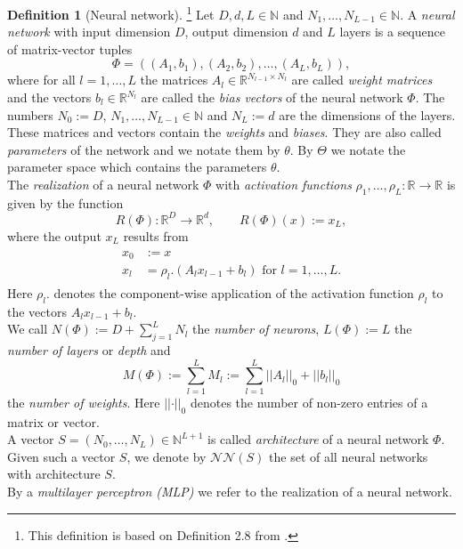 \documentclass[11pt,titlepage]{article}
\newcommand{\R}{\mathbb{R}} %
\newcommand{\N}{\mathbb{N}} %
\newcommand{\abs}[1]{{\left| #1 \right|}}
\theoremstyle{definition}
\newtheorem{definition}[theorem]{Definition}
\theoremstyle{remark}
\begin{document}
	\begin{definition}[Neural network]\footnote{This definition is based on Definition 2.8 from \cite{Petersen2022}.}
		Let $D, d, L\in\N$ and $N_1,\ldots,N_{L-1}\in\N$. A \textsl{neural network} with input dimension $D$, output dimension $d$ and $L$ layers is a sequence of matrix-vector tuples
		\[\Phi = ((A_1,b_1),(A_2,b_2),\ldots,(A_L,b_L)),\]
		where for all $l=1,\ldots, L$ the matrices $A_l\in\R^{N_{l-1}\times N_l}$ are called \textsl{weight matrices} and the vectors $b_l\in \R^{N_l}$ are called the \textsl{bias vectors} of the neural network $\Phi$. The numbers $N_0:= D$, $N_1,\ldots,N_{L-1}\in\N$ and $N_L:= d$ are the dimensions of the layers. These matrices and vectors contain the \textsl{weights} and \textsl{biases}. They are also called \textsl{parameters} of the network and we notate them by $\theta$. By $\Theta$ we notate the parameter space which contains the parameters $\theta$.\\
		The \textsl{realization} of a neural network $\Phi$ with \textsl{activation functions} 
		$\rho_1,\ldots,\rho_{L}:\R\to\R$ is given by the function
		\[R(\Phi):\R^D\to\R^d,\qquad R(\Phi)(x):=x_L,\]
		where the output $x_L$ results from
		\begin{align}
			\begin{split}
				x_0&:=x \\
				x_l &= \rho_l .(A_l x_{l-1} + b_l) \text{ for } l = 1,\ldots, L. \label{Def. realization neural network}
			\end{split}
		\end{align}
		Here $\rho_l .$ denotes the component-wise application of the activation function $\rho_l$ to the vectors $A_l x_{l-1} + b_l$.\\
		We call $N(\Phi):= D + \sum_{j=1}^L N_l$ the \textsl{number of neurons}, $L(\Phi):= L$ the 	\textsl{number of layers} or \textsl{depth} and 
		\[M(\Phi):= \sum_{l=1}^L M_l:=\sum_{l=1}^L \abs{\abs{A_l}}_0 + \abs{\abs{b_l}}_0\]
		the \textsl{number of weights}. Here $\abs{\abs{\cdot}}_0$ denotes the number of non-zero entries of a matrix or vector. \\
		A vector $S=(N_0,\ldots,N_L)\in\N^{L+1}$ is called \textsl{architecture} of a neural network $\Phi$.
		Given such a vector $S$, we denote by $\mathcal{N}\mathcal{N}(S)$ the set of all neural networks with architecture $S$.\\
		By a \textsl{multilayer perceptron (MLP)} we refer to the realization of a neural network.
	\end{definition}	
	
\end{document}
